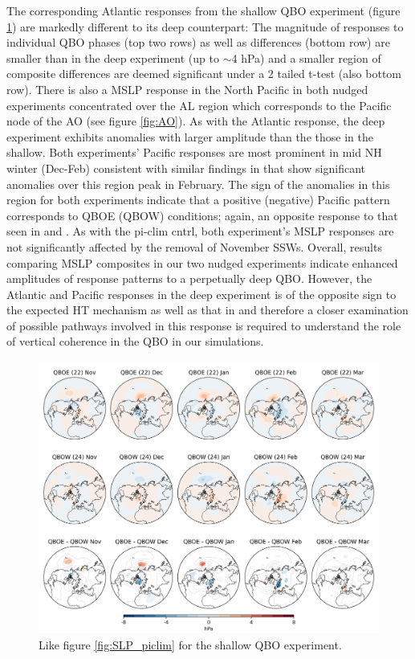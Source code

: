 The corresponding Atlantic responses from the shallow QBO experiment (figure \ref{fig:SLP_shallow}) are markedly different to its deep counterpart: The magnitude of responses to individual QBO phases (top two rows) as well as differences (bottom row) are smaller than in the deep experiment (up to $\sim$4 hPa) and a smaller region of composite differences are deemed significant under a 2 tailed t-test (also bottom row). There is also a MSLP response in the North Pacific in both nudged experiments concentrated over the AL region which corresponds to the Pacific node of the AO (see figure \ref{fig:AO}). As with the Atlantic response, the deep experiment exhibits anomalies with larger amplitude than the those in the shallow. Both experiments' Pacific responses are most prominent in mid NH winter (Dec-Feb) consistent with similar findings in \cite{graySurface2018b} that show significant anomalies over this region peak in February. The sign of the anomalies in this region for both experiments indicate that a positive (negative) Pacific pattern corresponds to QBOE (QBOW) conditions; again, an opposite response to that seen in \cite{andrewsObserved2019d} and \cite{graySurface2018b}. As with the pi-clim cntrl, both experiment's MSLP responses are not significantly affected by the removal of November SSWs. Overall, results comparing MSLP composites in our two nudged experiments indicate enhanced amplitudes of response patterns to a perpetually deep QBO. However, the Atlantic and Pacific responses in the deep experiment is of the opposite sign to the expected HT mechanism as well as that in \citep{andrewsObserved2019d} and therefore a closer examination of possible pathways involved in this response is required to understand the role of vertical coherence in the QBO in our simulations.

\begin{figure}[h!]
\begin{center}
\noindent\includegraphics[width =0.8\linewidth]{Figures/Figures-deepQBO/LAGGED_SLP_composites_individual_months_QBO_phases_U_s_50hPa_5thresh.png}
\caption[MSLP composites under QBO phases in the shallow QBO simulation]{Like figure \ref{fig:SLP_piclim} for the shallow QBO experiment.}
\label{fig:SLP_shallow}
\end{center}
\end{figure}
\newpage

